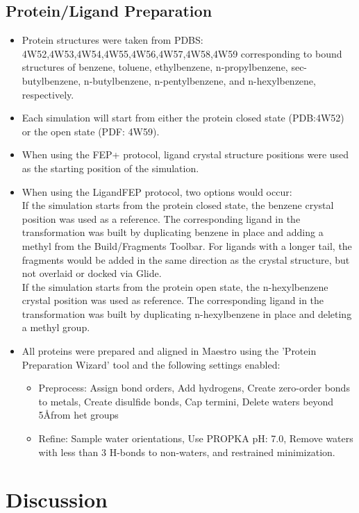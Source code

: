 \documentclass{article}
\begin{document}
\subsection{Protein/Ligand Preparation}
   \begin{itemize}
   \item Protein structures were taken from PDBS: 4W52,4W53,4W54,4W55,4W56,4W57,4W58,4W59 corresponding to bound structures of benzene, toluene, ethylbenzene, n-propylbenzene, sec-butylbenzene, n-butylbenzene, n-pentylbenzene, and n-hexylbenzene, respectively.
   \item Each simulation will start from either the protein closed state (PDB:4W52) or the open state (PDF: 4W59).
   \item When using the FEP+ protocol, ligand crystal structure positions were used as the starting position of the simulation.
   \item When using the LigandFEP protocol, two options would occur:
      \\If the simulation starts from the protein closed state, the benzene crystal position was used as a reference. 
      The corresponding ligand in the transformation was built by duplicating benzene in place and adding a methyl from the Build/Fragments Toolbar. 
      For ligands with a longer tail, the fragments would be added in the same direction as the crystal structure, but not overlaid or docked via Glide.
      \\If the simulation starts from the protein open state, the n-hexylbenzene crystal position was used as reference. 
      The corresponding ligand in the transformation was built by duplicating n-hexylbenzene in place and deleting a methyl group.
   \item All proteins were prepared and aligned in Maestro using the 'Protein Preparation Wizard' tool and the following settings enabled:
   \begin{itemize}
      \item Preprocess: Assign bond orders, Add hydrogens, Create zero-order bonds to metals, Create disulfide bonds, Cap termini, Delete waters beyond 5\AA from het groups
      \item Refine: Sample water orientations, Use PROPKA pH: 7.0, Remove waters with less than 3 H-bonds to non-waters, and restrained minimization.
   \end{itemize}
   \end{itemize}
   
\section{Discussion}
\end{document}
